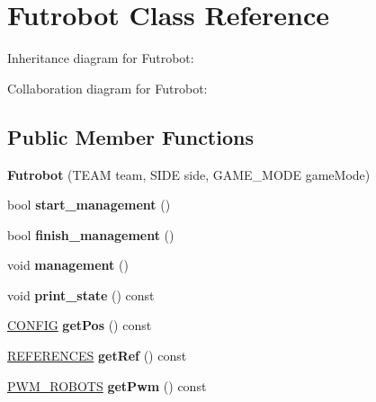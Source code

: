 \hypertarget{classFutrobot}{}\section{Futrobot Class Reference}
\label{classFutrobot}


Inheritance diagram for Futrobot\+:


Collaboration diagram for Futrobot\+:
\subsection*{Public Member Functions}
\begin{DoxyCompactItemize}
\item 
{\bfseries Futrobot} (T\+E\+AM team, S\+I\+DE side, G\+A\+M\+E\+\_\+\+M\+O\+DE game\+Mode)\hypertarget{classFutrobot_adb48ef604aefb3869bf944acd10f9938}{}\label{classFutrobot_adb48ef604aefb3869bf944acd10f9938}

\item 
bool {\bfseries start\+\_\+management} ()\hypertarget{classFutrobot_ac2c81622d1ddc426abdb5b2bb7c0f359}{}\label{classFutrobot_ac2c81622d1ddc426abdb5b2bb7c0f359}

\item 
bool {\bfseries finish\+\_\+management} ()\hypertarget{classFutrobot_a5906c1282ed0e2892ae67477617a2daf}{}\label{classFutrobot_a5906c1282ed0e2892ae67477617a2daf}

\item 
void {\bfseries management} ()\hypertarget{classFutrobot_a11dccc660c0fcf79bcdd0da71ec1cbc7}{}\label{classFutrobot_a11dccc660c0fcf79bcdd0da71ec1cbc7}

\item 
void {\bfseries print\+\_\+state} () const \hypertarget{classFutrobot_a4574e195e38d970d18c5f98ac2ff7201}{}\label{classFutrobot_a4574e195e38d970d18c5f98ac2ff7201}

\item 
\hyperlink{structCONFIG}{C\+O\+N\+F\+IG} {\bfseries get\+Pos} () const \hypertarget{classFutrobot_a1fbbdc008f792e52565762185c20f782}{}\label{classFutrobot_a1fbbdc008f792e52565762185c20f782}

\item 
\hyperlink{structREFERENCES}{R\+E\+F\+E\+R\+E\+N\+C\+ES} {\bfseries get\+Ref} () const \hypertarget{classFutrobot_a266ba3c5bcc4230dbefe256e4584d332}{}\label{classFutrobot_a266ba3c5bcc4230dbefe256e4584d332}

\item 
\hyperlink{structPWM__ROBOTS}{P\+W\+M\+\_\+\+R\+O\+B\+O\+TS} {\bfseries get\+Pwm} () const \hypertarget{classFutrobot_ade968ef9bbabb295559346c0b44769e6}{}\label{classFutrobot_ade968ef9bbabb295559346c0b44769e6}


\end{DoxyCompactItemize}
